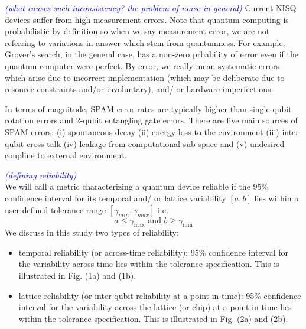 \documentclass[conference]{IEEEtran}
\begin{document}
\textcolor{blue}{\textit{(what causes such inconsistency? the problem of noise in general)}}
Current NISQ devices suffer from high measurement errors.
Note that quantum computing is probabilistic by definition so when we say measurement error, we are not referring to variations in answer which stem from quantumness. For example, Grover's search, in the general case, has a non-zero prbability of error even if the quantum computer were perfect.
By error, we really mean systematic errors which arise due to incorrect implementation (which may be deliberate due to resource constraints and/or involuntary), and/ or hardware imperfections.

In terms of magnitude, SPAM error rates are typically higher than single-qubit rotation errors and 2-qubit entangling gate errors. There are five main sources of SPAM errors: (i) spontaneous decay (ii) energy loss to the environment (iii) inter-qubit cross-talk (iv) leakage from computational sub-space and (v) undesired coupline to external environment.

\textcolor{blue}{\textit{(defining reliability)}}\\
We will call a metric characterizing a quantum device reliable if the 95\% confidence interval for its temporal and/ or lattice variability $[a,b]$ lies within a user-defined tolerance range $[\gamma_{min}, \gamma_{max}]$ i.e.
\begin{equation}
a \leq \gamma_{\textrm{max}} \textrm{ and } b \geq \gamma_{\textrm{min}}
\end{equation}
We discuss in this study two types of reliability:
\begin{itemize}
\item temporal reliability (or across-time reliability): 95\% confidence interval for the variability across time lies within the tolerance specification. This is illustrated in Fig. (1a) and (1b).
\item lattice reliability (or inter-qubit reliability at a point-in-time): 95\% confidence interval for the variability across the lattice (or chip) at a point-in-time lies within the tolerance specification. This is illustrated in Fig. (2a) and (2b).
\end{itemize}
\end{document}
